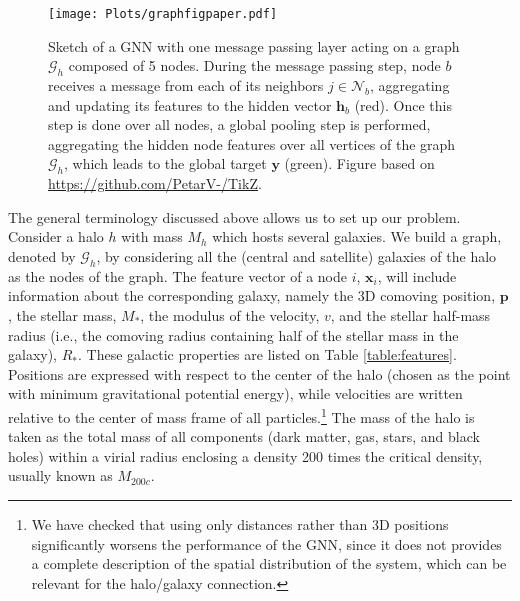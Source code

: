\documentclass[twocolumn]{aastex631}
\begin{document}
\begin{figure*}[th!]
\begin{center}
\texttt{[image: Plots/graphfigpaper.pdf]}
\caption{Sketch of a GNN with one message passing layer acting on a graph $\mathcal{G}_h$ composed of 5 nodes. During the message passing step, node $b$ receives a message from each of its neighbors $j \in \mathcal{N}_b$, aggregating and updating its features to the hidden vector $\textbf{h}_b$ (red). Once this step is done over all nodes, a global pooling step is performed, aggregating the hidden node features over all vertices of the graph $\mathcal{G}_h$, which leads to the global target $\textbf{y}$ (green). Figure based on \url{https://github.com/PetarV-/TikZ}.}
\label{fig:messagepassing}
\end{center}
\end{figure*}

The general terminology discussed above allows us to set up our problem. Consider a halo $h$ with mass $M_h$ which hosts several  galaxies. We build a graph, denoted by $\mathcal{G}_h$, by considering all the (central and satellite) galaxies of the halo as the nodes of the graph. The feature vector of a node $i$, $\textbf{x}_i$, will include information about the corresponding galaxy, namely the 3D comoving position, $\textbf{p}$, the stellar mass, $M_*$, the modulus of the velocity, $v$, and the stellar half-mass radius (i.e., the comoving radius containing half of the stellar mass in the galaxy), $R_*$. These galactic properties are listed on Table \ref{table:features}. Positions are expressed with respect to the center of the halo (chosen as the point with minimum gravitational potential energy), while velocities are written relative to the center of mass frame of all particles.\footnote{We have checked that using only distances rather than 3D positions significantly worsens the performance of the GNN, since it does not provides a complete description of the spatial distribution of the system, which can be relevant for the halo/galaxy connection.} The mass of the halo is taken as the total mass of all components (dark matter, gas, stars, and black holes) within a virial radius enclosing a density 200 times the critical density, usually known as $M_{200c}$.
\end{document}
